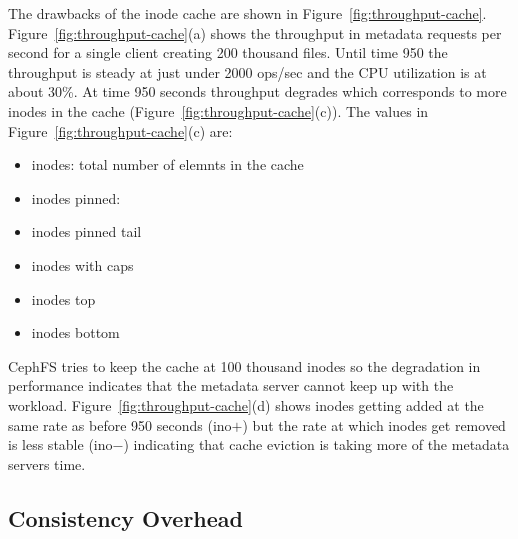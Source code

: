 
The drawbacks of the inode cache are shown in
Figure~\ref{fig:throughput-cache}.  Figure~\ref{fig:throughput-cache}(a) shows
the throughput in metadata requests per second for a single client creating 200
thousand files. Until time 950 the throughput is steady at just under 2000
ops/sec and the CPU utilization is at about 30\%. At time 950 seconds
throughput degrades which corresponds to more inodes in the cache
(Figure~\ref{fig:throughput-cache}(c)). The values in
Figure~\ref{fig:throughput-cache}(c) are:

\begin{itemize}
  \item inodes: total number of elemnts in the cache
  \item inodes pinned: 
  \item inodes pinned tail
  \item inodes with caps
  \item inodes top
  \item inodes bottom 
\end{itemize}

CephFS tries to keep the cache at 100 thousand inodes so the degradation in
performance indicates that the metadata server cannot keep up with the
workload. Figure~\ref{fig:throughput-cache}(d) shows inodes getting added at
the same rate as before 950 seconds (ino\(+\)) but the rate at which inodes get
removed is less stable (ino\(-\)) indicating that cache eviction is taking more
of the metadata servers time.

\subsection{Consistency Overhead}

